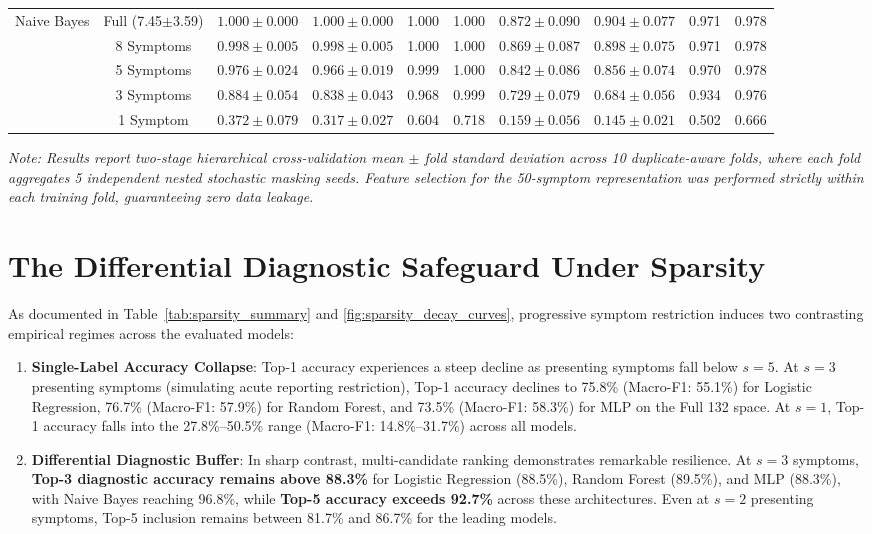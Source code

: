 \begin{table}[H]
{\begin{tabular}{cc|cccc|cccc}
\midrule
\multirow{5}{*}{Naive Bayes}
& Full (7.45$\pm$3.59) & $1.000 \pm 0.000$ & $1.000 \pm 0.000$ & 1.000 & 1.000 & $0.872 \pm 0.090$ & $0.904 \pm 0.077$ & 0.971 & 0.978 \\
& 8 Symptoms  & $0.998 \pm 0.005$ & $0.998 \pm 0.005$ & 1.000 & 1.000 & $0.869 \pm 0.087$ & $0.898 \pm 0.075$ & 0.971 & 0.978 \\
& 5 Symptoms  & $0.976 \pm 0.024$ & $0.966 \pm 0.019$ & 0.999 & 1.000 & $0.842 \pm 0.086$ & $0.856 \pm 0.074$ & 0.970 & 0.978 \\
& 3 Symptoms  & $0.884 \pm 0.054$ & $0.838 \pm 0.043$ & 0.968 & 0.999 & $0.729 \pm 0.079$ & $0.684 \pm 0.056$ & 0.934 & 0.976 \\
& 1 Symptom   & $0.372 \pm 0.079$ & $0.317 \pm 0.027$ & 0.604 & 0.718 & $0.159 \pm 0.056$ & $0.145 \pm 0.021$ & 0.502 & 0.666 \\
\bottomrule
\end{tabular}%
}
\begin{flushleft}
\scriptsize
\textit{Note: Results report two-stage hierarchical cross-validation mean $\pm$ fold standard deviation across 10 duplicate-aware folds, where each fold aggregates 5 independent nested stochastic masking seeds. Feature selection for the 50-symptom representation was performed strictly within each training fold, guaranteeing zero data leakage.}
\end{flushleft}
\end{table}

\section{The Differential Diagnostic Safeguard Under Sparsity}
\label{sec:differential_safeguard}
As documented in Table~\ref{tab:sparsity_summary} and \cref{fig:sparsity_decay_curves}, progressive symptom restriction induces two contrasting empirical regimes across the evaluated models:
\begin{enumerate}
    \item \textbf{Single-Label Accuracy Collapse}: Top-1 accuracy experiences a steep decline as presenting symptoms fall below $s = 5$. At $s = 3$ presenting symptoms (simulating acute reporting restriction), Top-1 accuracy declines to 75.8\% (Macro-F1: 55.1\%) for Logistic Regression, 76.7\% (Macro-F1: 57.9\%) for Random Forest, and 73.5\% (Macro-F1: 58.3\%) for MLP on the Full 132 space. At $s = 1$, Top-1 accuracy falls into the 27.8\%--50.5\% range (Macro-F1: 14.8\%--31.7\%) across all models.
    \item \textbf{Differential Diagnostic Buffer}: In sharp contrast, multi-candidate ranking demonstrates remarkable resilience. At $s = 3$ symptoms, \textbf{Top-3 diagnostic accuracy remains above 88.3\%} for Logistic Regression (88.5\%), Random Forest (89.5\%), and MLP (88.3\%), with Naive Bayes reaching 96.8\%, while \textbf{Top-5 accuracy exceeds 92.7\%} across these architectures. Even at $s = 2$ presenting symptoms, Top-5 inclusion remains between 81.7\% and 86.7\% for the leading models.
\end{enumerate}

